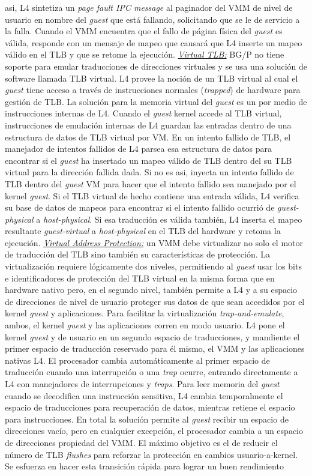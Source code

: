 asi, L4 sintetiza un \emph{page fault IPC message} al paginador del VMM de nivel de usuario en nombre del \emph{guest} que está fallando, solicitando que se le de servicio a la falla. Cuando el VMM encuentra que el fallo de página física del \emph{guest} es válida, responde con un mensaje de mapeo que causará que L4 inserte un mapeo válido en el TLB y que se retome la ejecución. \underline{\emph{Virtual TLB:}} BG/P no tiene soporte para emular traducciones de direcciones virtuales y se usa una solución de software llamada TLB virtual. L4 provee la noción de un TLB virtual al cual el \emph{guest} tiene acceso a través de instrucciones normales (\emph{trapped}) de hardware para gestión de TLB. La solución para la memoria virtual del \emph{guest} es un por medio de instrucciones internas de L4. Cuando el \emph{guest} kernel accede al TLB virtual, instrucciones de emulación internas de L4 guardan las entradas dentro de una estructura de datos de TLB virtual por VM. En un intento fallido de TLB, el manejador de intentos fallidos de L4 parsea esa estructura de datos para encontrar si el \emph{guest} ha insertado un mapeo válido de TLB dentro del su TLB virtual para la dirección fallida dada. Si no es asi, inyecta un intento fallido de TLB dentro del \emph{guest} VM para hacer que el intento fallido sea manejado por el kernel \emph{guest}. Si el TLB virtual de hecho contiene una entrada válida, L4 verifica su base de datos de mapeos para encontrar si el intento fallido ocurrió de \emph{guest-physical} a \emph{host-physical}. Si esa traducción es válida también, L4 inserta el mapeo resultante \emph{guest-virtual} a \emph{host-physical} en el TLB del hardware y retoma la ejecución. \underline{\emph{Virtual Address Protection:}} un VMM debe virtualizar no solo el motor de traducción del TLB sino también su características de protección. La virtualización requiere lógicamente dos niveles, permitiendo al \emph{guest} usar los bits e identificadores de protección del TLB virtual en la misma forma que en hardware nativo pero, en el segundo nivel, también permite a L4 y a su espacio de direcciones de nivel de usuario proteger sus datos de que sean accedidos por el kernel \emph{guest} y aplicaciones. Para facilitar la virtualización \emph{trap-and-emulate}, ambos, el kernel \emph{guest} y las aplicaciones corren en modo usuario. L4 pone el kernel \emph{guest} y de usuario en un segundo espacio de traducciones, y mandiente el primer espacio de traducción reservado para él mismo, el VMM y las aplicaciones nativas L4. El procesador cambia automáticamente al primer espacio de traducción cuando una interrupción o una \emph{trap} ocurre, entrando directamente a L4 con manejadores de interrupciones y \emph{traps}. Para leer memoria del \emph{guest} cuando se decodifica una instrucción sensitiva, L4 cambia temporalmente el espacio de traducciones para recuperación de datos, mientras retiene el espacio para instrucciones. En total la solución permite al \emph{guest} recibir un espacio de direcciones vacío, pero en cualquier excepción, el procesador cambia a un espacio de direcciones propiedad del VMM. El máximo objetivo es el de reducir el número de TLB \emph{flushes} para reforzar la protección en cambios usuario-a-kernel. Se esfuerza en hacer esta transición rápida para lograr un buen rendimiento 